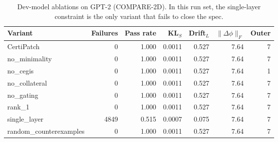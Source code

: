 \begin{table}[t]
\centering
\small
\setlength{\tabcolsep}{5pt}
\begin{tabular}{lrrrrrr}
\toprule
Variant & Failures & Pass rate & KL$_S$ & Drift$_L$ & $\|\Delta\phi\|_F$ & Outer \\
\midrule
CertiPatch & 0 & 1.000 & 0.0011 & 0.527 & 7.64 & 7 \\
no\_minimality & 0 & 1.000 & 0.0011 & 0.527 & 7.64 & 7 \\
no\_cegis & 0 & 1.000 & 0.0011 & 0.527 & 7.64 & 1 \\
no\_collateral & 0 & 1.000 & 0.0011 & 0.527 & 7.64 & 7 \\
no\_gating & 0 & 1.000 & 0.0011 & 0.527 & 7.64 & 7 \\
rank\_1 & 0 & 1.000 & 0.0011 & 0.527 & 7.64 & 7 \\
single\_layer & 4849 & 0.515 & 0.0007 & 0.075 & 7.64 & 7 \\
random\_counterexamples & 0 & 1.000 & 0.0011 & 0.527 & 7.64 & 7 \\
\bottomrule
\end{tabular}
\caption{Dev-model ablations on GPT-2 (COMPARE-2D). In this run set, the single-layer constraint is the only variant that fails to close the spec.}
\label{tab:ablations}
\end{table}
